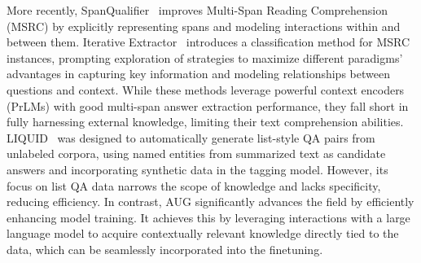 More recently, SpanQualifier~\citep{huang2023qualifier} improves Multi-Span Reading Comprehension (MSRC) by explicitly representing spans and modeling interactions within and between them.
Iterative Extractor~\citep{zhang2023many} introduces a classification method for MSRC instances, prompting exploration of strategies to maximize different paradigms' advantages in capturing key information and modeling relationships between questions and context.
While these methods leverage powerful context encoders (PrLMs) with good multi-span answer extraction performance, they fall short in fully harnessing external knowledge, limiting their text comprehension abilities.
LIQUID~\citep{lee2023liquid} was designed to automatically generate list-style QA pairs from unlabeled corpora, using named entities from summarized text as candidate answers and incorporating synthetic data in the tagging model. However, its focus on list QA data narrows the scope of knowledge and lacks specificity, reducing efficiency.
In contrast, AUG significantly advances the field by efficiently enhancing model training. It achieves this by leveraging interactions with a large language model to acquire contextually relevant knowledge directly tied to the data, which can be seamlessly incorporated into the finetuning.

